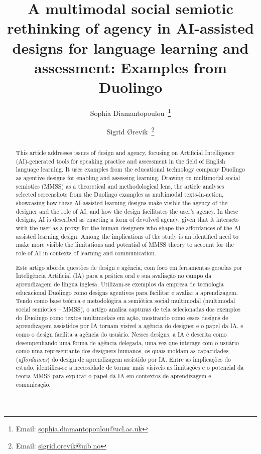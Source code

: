 \documentclass[english]{textolivre}
\title{A multimodal social semiotic rethinking of agency in AI-assisted designs for language learning and assessment: Examples from Duolingo}
\author[1]{Sophia Diamantopoulou~\orcid{0000-0001-8564-8743}\thanks{Email: \href{mailto:sophia.diamantopoulou@ucl.ac.uk}{sophia.diamantopoulou@ucl.ac.uk}}}
\author[2]{Sigrid Ørevik~\orcid{0000-0002-0812-4572}\thanks{Email: \href{mailto:sigrid.orevik@uib.no}{sigrid.orevik@uib.no}}}
\affil[1]{University College London, Institute of Education, London, United Kingdom.}
\affil[2]{University of Bergen, Department of Foreign Languages, Bergen, Norway.}
\begin{document}
\maketitle

\begin{polyabstract}
\begin{abstract}
This article addresses issues of design and agency, focusing on Artificial Intelligence (AI)-generated tools for speaking practice and assessment in the field of English language learning. It uses examples from the educational technology company Duolingo as agentive designs for enabling and assessing learning. Drawing on multimodal social semiotics (MMSS) as a theoretical and methodological lens, the article analyses selected screenshots from the Duolingo examples as multimodal texts-in-action, showcasing how these AI-assisted learning designs make visible the agency of the designer and the role of AI, and how the design facilitates the user’s agency. In these designs, AI is described as enacting a form of devolved agency, given that it interacts with the user as a proxy for the human designers who shape the affordances of the AI-assisted learning design. Among the implications of the study is an identified need to make more visible the limitations and potential of MMSS theory to account for the role of AI in contexts of learning and communication.

\end{abstract}

\begin{portuguese}
\begin{abstract}
Este artigo aborda questões de design e agência, com foco em ferramentas geradas por Inteligência Artificial (IA) para a prática oral e sua avaliação no campo da aprendizagem de língua inglesa. Utilizam-se exemplos da empresa de tecnologia educacional Duolingo como designs agentivos para facilitar e avaliar a aprendizagem. Tendo como base teórica e metodológica a semiótica social multimodal (multimodal social semiotics – MMSS), o artigo analisa capturas de tela selecionadas dos exemplos do Duolingo como textos multimodais em ação, mostrando como esses designs de aprendizagem assistidos por IA tornam visível a agência do designer e o papel da IA, e como o design facilita a agência do usuário. Nesses designs, a IA é descrita como desempenhando uma forma de agência delegada, uma vez que interage com o usuário como uma representante dos designers humanos, os quais moldam as capacidades (\textit{affordances}) do design de aprendizagem assistido por IA. Entre as implicações do estudo, identifica-se a necessidade de tornar mais visíveis as limitações e o potencial da teoria MMSS para explicar o papel da IA em contextos de aprendizagem e comunicação.


\end{abstract}
\end{portuguese}
\end{polyabstract}
\end{document}
